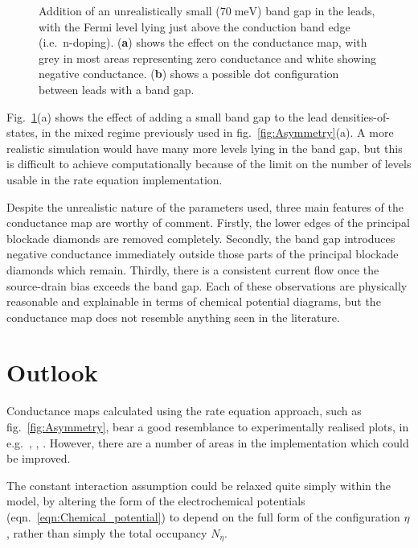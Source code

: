 \documentclass[a4paper,11pt]{article}
\let\oldcite\cite
\renewcommand{\cite}[1]{\textsuperscript{\oldcite{#1}}}
\begin{document}
\begin{figure}
\begin{center}
{\hspace{20pt}
        }
        \caption{Addition of an unrealistically small ($70\;\mathrm{meV}$) band gap in the leads, with the Fermi level lying just above the conduction band edge (i.e.\ n-doping). (\textbf{a}) shows the effect on the conductance map, with grey in most areas representing zero conductance and white showing negative conductance. (\textbf{b}) shows a possible dot configuration between leads with a band gap.}
        \label{fig:Band_gap}
    \end{center}
    \end{figure}

    Fig.~\ref{fig:Band_gap}(a) shows the effect of adding a small band gap to the lead densities-of-states, in the mixed regime previously used in fig.~\ref{fig:Asymmetry}(a). A more realistic simulation would have many more levels lying in the band gap, but this is difficult to achieve computationally because of the limit on the number of levels usable in the rate equation implementation.

    Despite the unrealistic nature of the parameters used, three main features of the conductance map are worthy of comment. Firstly, the lower edges of the principal blockade diamonds are removed completely. Secondly, the band gap introduces negative conductance immediately outside those parts of the principal blockade diamonds which remain. Thirdly, there is a consistent current flow once the source-drain bias exceeds the band gap. Each of these observations are physically reasonable and explainable in terms of chemical potential diagrams, but the conductance map does not resemble anything seen in the literature.

    \section{Outlook}

    Conductance maps calculated using the rate equation approach, such as fig.~\ref{fig:Asymmetry}, bear a good resemblance to experimentally realised plots, in e.g.\ \oldcite{Kouwenhoven-1997}, \oldcite{Dushmukh-2002}, \oldcite{Fuechsle-2010}. However, there are a number of areas in the implementation which could be improved.

    The constant interaction assumption could be relaxed quite simply within the model, by altering the form of the electrochemical potentials (eqn.~\ref{eqn:Chemical_potential}) to depend on the full form of the configuration $\eta$, rather than simply the total occupancy $N_\eta$.
\end{document}
